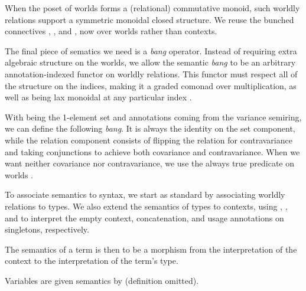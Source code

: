 
When the poset of worlds forms a (relational) commutative monoid, such worldly
relations support a symmetric monoidal closed structure.
We reuse the bunched connectives , \AgdaRecord{$\sep$}, and
\AgdaRecord{$\wand$}, now over worlds rather than contexts.


The final piece of sematics we need is a \emph{bang} operator.
Instead of requiring extra algebraic structure on the worlds, we allow the
semantic \emph{bang} to be an arbitrary annotation-indexed functor on worldly
relations.
This functor must respect all of the structure on the indices, making it a
graded comonad over multiplication, as well as being lax monoidal at any
particular index .


\begin{example}
  With  being the 1-element set and annotations coming from the
  variance semiring, we can define the following \emph{bang}.
  It is always the identity on the set component, while the relation component
  consists of flipping the relation for contravariance and taking conjunctions
  to achieve both covariance and contravariance.
  When we want neither covariance nor contravariance, we use the always true
  predicate on worlds .

\end{example}

To associate semantics to syntax, we start as standard by associating worldly
relations to types.
We also extend the semantics of types to contexts, using ,
, and  to interpret the empty
context, concatenation, and usage annotations on singletons, respectively.


The semantics of a term is then to be a morphism from the interpretation of the
context to the interpretation of the term's type.


Variables are given semantics by  (definition omitted).


